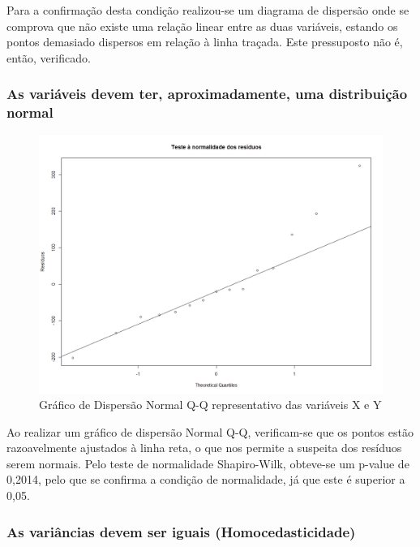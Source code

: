 \documentclass[conference]{IEEEtran}
\begin{document}
Para a confirmação desta condição realizou-se um diagrama de dispersão onde se comprova que não existe uma relação linear entre as duas variáveis, estando os pontos demasiado dispersos em relação à linha traçada. Este pressuposto não é, então, verificado.

\subsubsection{As variáveis devem ter, aproximadamente, uma distribuição normal}

\begin{figure}[htbp]
\centerline{\includegraphics[width=0.95\columnwidth]{images/03.a.3.png}}
\caption{Gráfico de Dispersão Normal Q-Q representativo das variáveis X e Y}
\label{fig}
\end{figure}

Ao realizar um gráfico de dispersão Normal Q-Q, verificam-se que os pontos estão razoavelmente ajustados à linha reta, o que nos permite a suspeita dos resíduos serem normais. Pelo teste de normalidade Shapiro-Wilk, obteve-se um p-value de 0,2014, pelo que se confirma a condição de normalidade, já que este é superior a 0,05.

\subsubsection{As variâncias devem ser iguais (Homocedasticidade)}
\end{document}
